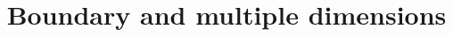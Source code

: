 \documentclass[10pt,a4paper]{article}
\begin{document}
\title{Boundary and multiple dimensions}

\date{}

\maketitle


\end{document}
